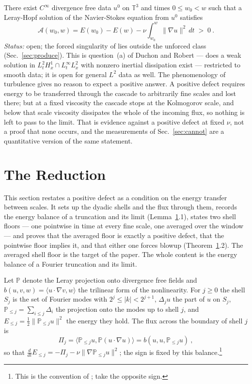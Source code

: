 \documentclass[letterpaper,twocolumn]{article}
\newenvironment{propbox}[1]{\par\medskip\noindent{\bf #1.} }{\par\medskip}
\newcommand{\T}{\mathbb{T}}
\newcommand{\PP}{\mathbb{P}}
\newcommand{\A}{\mathcal{A}}
\begin{document}
\begin{propbox}{The positive defect problem}
There exist $C^\infty$ divergence free data $u^0$ on $\T^3$ and times
$0 \leq w_0 < w$ such that a Leray-Hopf solution of the Navier-Stokes
equation from $u^0$ satisfies
\[
\A(w_0, w) = E(w_0) - E(w) - \nu \int_{w_0}^{w} \|\nabla u\|^2 \, dt
\;>\; 0 \ .
\]
\emph{Status:} open; the forced singularity of \cite{OpenAI26NS} lies
outside the unforced class (Sec.~\ref{sec:produce}). This is
question~(a) of Duchon and Robert \cite{DucRob00} --- does a weak
solution in $L^2_t H^1_x \cap L^\infty_t L^2_x$ with nonzero inertial
dissipation exist --- restricted to smooth data; it is open for general
$L^2$ data as well. The phenomenology of turbulence gives no reason to
expect a positive answer. A positive defect requires energy to be
transferred through the cascade to arbitrarily fine scales and lost
there; but at a fixed viscosity the cascade stops at the Kolmogorov
scale, and below that scale viscosity dissipates the whole of the
incoming flux, so nothing is left to pass to the limit. That is evidence against a positive defect at
fixed $\nu$, not a proof that none occurs, and the measurements of
Sec.~\ref{sec:cannot} are a quantitative version of the same statement.
\end{propbox}

\section{The Reduction}
\label{sec:reduction}

This section restates a positive defect as a condition on the energy
transfer between scales. It sets up the dyadic shells and the flux
through them, records the energy balance of a truncation and its limit
(Lemma~\ref{sec:reduction}.1), states two shell floors --- one pointwise
in time at every fine scale, one averaged over the window --- and proves
that the averaged floor is exactly a positive defect, that the pointwise
floor implies it, and that either one forces blowup
(Theorem~\ref{sec:reduction}.2). The averaged shell floor is the target
of the paper. The whole content is the energy balance of a
Fourier truncation and its limit.

Let $\PP$ denote the Leray projection onto divergence free fields and
$b(u,v,w) = \langle u\cdot\nabla v, w\rangle$ the trilinear form of the
nonlinearity. For $j \geq 0$ the shell $S_j$ is the set of Fourier modes
with $2^j \leq |k| < 2^{j+1}$, $\Delta_j u$ the part of $u$ on $S_j$,
$\PP_{\leq j} = \sum_{i \leq j}\Delta_i$ the projection onto the modes up
to shell $j$, and $E_{\leq j} = \frac12 \|\PP_{\leq j}u\|^2$ the energy
they hold. The flux across the boundary of shell $j$ is
\begin{equation}
\label{eq:flux}
\Pi_j = \langle \PP_{\leq j} u, \PP(u \cdot \nabla u) \rangle
= b(u, u, \PP_{\leq j} u) \ ,
\end{equation}
so that $\frac{d}{dt} E_{\leq j} = -\Pi_j - \nu \|\nabla \PP_{\leq j}
u\|^2$; the sign is fixed by this balance.\footnote{This is the convention
of \cite{Shv10}; \cite{CheConFriShv08} take the opposite sign.}
\end{document}
